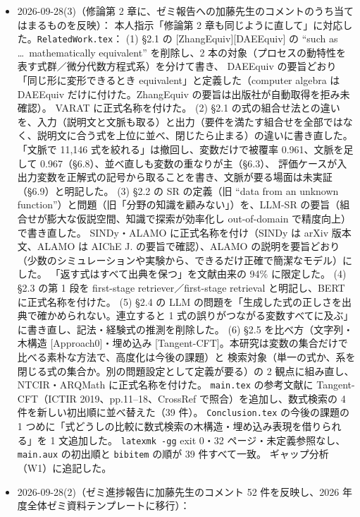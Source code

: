 \documentclass[11pt,a4paper]{jsarticle}
\begin{document}
\begin{itemize}[nosep]
    加藤先生のコメントと修正の対応表（Artifact、40 項目）も更新した。
  \item 2026-09-28(3)（修論第 2 章に、ゼミ報告への加藤先生のコメントのうち当てはまるものを反映）：
    本人指示「修論第 2 章も同じように直して」に対応した。\texttt{RelatedWork.tex}：
    (1) \S2.1 の [ZhangEquiv][DAEEquiv] の ``such as \ldots\ mathematically equivalent'' を削除し、2 本の対象（プロセスの動特性を表す式群／微分代数方程式系）を分けて書き、
    DAEEquiv の要旨どおり「同じ形に変形できるとき equivalent」と定義した（computer algebra は DAEEquiv だけに付けた。ZhangEquiv の要旨は出版社が自動取得を拒み未確認）。
    VARAT に正式名称を付けた。
    (2) \S2.1 の式の組合せ法との違いを、入力（説明文と文脈も取る）と出力（要件を満たす組合せを全部ではなく、説明文に合う式を上位に並べ、閉じたら止まる）の違いに書き直した。
    「文脈で 11,146 式を絞れる」は撤回し、変数だけで被覆率 0.961、文脈を足して 0.967（\S6.8）、並べ直しも変数の重なりが主（\S6.3）、
    評価ケースが入出力変数を正解式の記号から取ることを書き、文脈が要る場面は未実証（\S6.9）と明記した。
    (3) \S2.2 の SR の定義（旧 ``data from an unknown function''）と問題（旧「分野の知識を顧みない」）を、LLM-SR の要旨（組合せが膨大な仮説空間、知識で探索が効率化し out-of-domain で精度向上）で書き直した。
    SINDy・ALAMO に正式名称を付け（SINDy は arXiv 版本文、ALAMO は AIChE J. の要旨で確認）、ALAMO の説明を要旨どおり（少数のシミュレーションや実験から、できるだけ正確で簡潔なモデル）にした。
    「返す式はすべて出典を保つ」を文献由来の 94\% に限定した。
    (4) \S2.3 の第 1 段を first-stage retriever／first-stage retrieval と明記し、BERT に正式名称を付けた。
    (5) \S2.4 の LLM の問題を「生成した式の正しさを出典で確かめられない。連立すると 1 式の誤りがつながる変数すべてに及ぶ」に書き直し、記法・経験式の推測を削除した。
    (6) \S2.5 を比べ方（文字列・木構造 [Approach0]・埋め込み [Tangent-CFT]。本研究は変数の集合だけで比べる素朴な方法で、高度化は今後の課題）と
    検索対象（単一の式か、系を閉じる式の集合か。別の問題設定として定義が要る）の 2 観点に組み直し、NTCIR・ARQMath に正式名称を付けた。
    \texttt{main.tex} の参考文献に Tangent-CFT（ICTIR 2019、pp.11--18、CrossRef で照合）を追加し、数式検索の 4 件を新しい初出順に並べ替えた（39 件）。
    \texttt{Conclusion.tex} の今後の課題の 1 つめに「式どうしの比較に数式検索の木構造・埋め込み表現を借りられる」を 1 文追加した。
    \texttt{latexmk -gg} exit 0・32 ページ・未定義参照なし、\texttt{main.aux} の初出順と \texttt{bibitem} の順が 39 件すべて一致。
    ギャップ分析（W1）に追記した。
  \item 2026-09-28(2)（ゼミ進捗報告に加藤先生のコメント 52 件を反映し、2026 年度全体ゼミ資料テンプレートに移行）：

\end{itemize}
\end{document}
